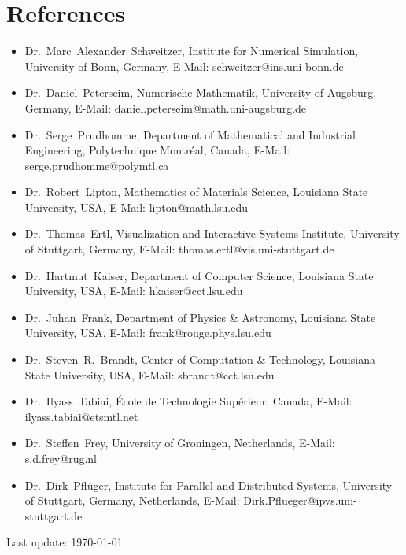 \documentclass[11pt,a4paper,sans]{moderncv}
\begin{document}
\section{References}
\begin{itemize}[leftmargin=4cm]
\item Dr.~Marc~Alexander~Schweitzer, Institute for Numerical Simulation, University of Bonn, Germany, E-Mail: schweitzer@ins.uni-bonn.de
\item Dr.~Daniel~Peterseim, Numerische Mathematik, University of Augsburg, Germany, E-Mail: daniel.peterseim@math.uni-augsburg.de
\end{itemize}
\begin{itemize}[leftmargin=4cm]
\item Dr.~Serge~Prudhomme, Department of Mathematical and Industrial Engineering, Polytechnique Montr\'eal, Canada, E-Mail: serge.prudhomme@polymtl.ca
\end{itemize}
\begin{itemize}[leftmargin=4cm]
\item Dr.~Robert~Lipton, Mathematics of Materials Science, Louisiana State University, USA, E-Mail: lipton@math.lsu.edu
\item Dr.~Thomas~Ertl, Visualization and Interactive Systems Institute, University of Stuttgart, Germany, E-Mail: thomas.ertl@vis.uni-stuttgart.de
\item Dr.~Hartmut~Kaiser, Department of Computer Science, Louisiana State University, USA, E-Mail: hkaiser@cct.lsu.edu
\item Dr.~Juhan~Frank, Department of Physics \& Astronomy, Louisiana State University, USA, E-Mail: frank@rouge.phys.lsu.edu
\item Dr.~Steven~R.~Brandt, Center of Computation \& Technology, Louisiana State University, USA, E-Mail: sbrandt@cct.lsu.edu
\item Dr.~Ilyass~Tabiai, École de Technologie Supérieur, Canada, E-Mail: ilyass.tabiai@etsmtl.net
\item Dr.~Steffen~Frey, University of Groningen, Netherlands, E-Mail: s.d.frey@rug.nl
\item Dr.~Dirk~Pfl\"uger, Institute for Parallel and Distributed Systems, University of Stuttgart, Germany, Netherlands, E-Mail: Dirk.Pflueger@ipvs.uni-stuttgart.de
\end{itemize}
\begin{center}
Last update: \today
\end{center}
\end{document}

